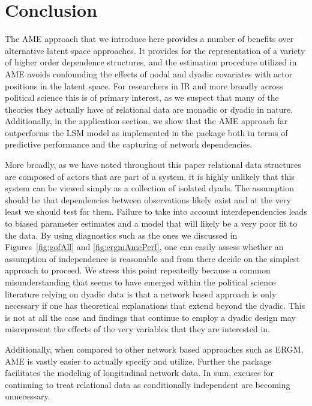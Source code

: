 \section{\textbf{Conclusion}}

The AME approach that we introduce here provides a number of benefits over alternative latent space approaches. It provides for the representation of a variety of higher order dependence structures, and the estimation procedure utilized in AME avoids confounding the effects of nodal and dyadic covariates with actor positions in the latent space. For researchers in IR and more broadly across political science this is of primary interest, as we suspect that many of the theories they actually have of relational data are monadic or dyadic in nature. Additionally, in the application section, we show that the AME approach far outperforms the LSM model as implemented in the  package both in terms of predictive performance and the capturing of network dependencies. 

More broadly, as we have noted throughout this paper relational data structures are composed of actors that are part of a system, it is highly unlikely that this system can be viewed simply as a collection of isolated dyads. The assumption should be that dependencies between observations likely exist and at the very least we should test for them. Failure to take into account interdependencies leads to biased parameter estimates and a model that will likely be a very poor fit to the data. By using diagnostics such as the ones we discussed in Figures~\ref{fig:gofAll} and \ref{fig:ergmAmePerf}, one can easily assess whether an assumption of independence is reasonable and from there decide on the simplest approach to proceed. We stress this point repeatedly because a common misunderstanding that seems to have emerged within the political science literature relying on dyadic data is that a network based approach is only necessary if one has theoretical explanations that extend beyond the dyadic. This is not at all the case and findings that continue to employ a dyadic design may misrepresent the effects of the very variables that they are interested in. 

Additionally, when compared to other network based approaches such as ERGM, AME is vastly easier to actually specify and utilize. Further the  package facilitates the modeling of longitudinal network data. In sum, excuses for continuing to treat relational data as conditionally independent are becoming unnecessary. 